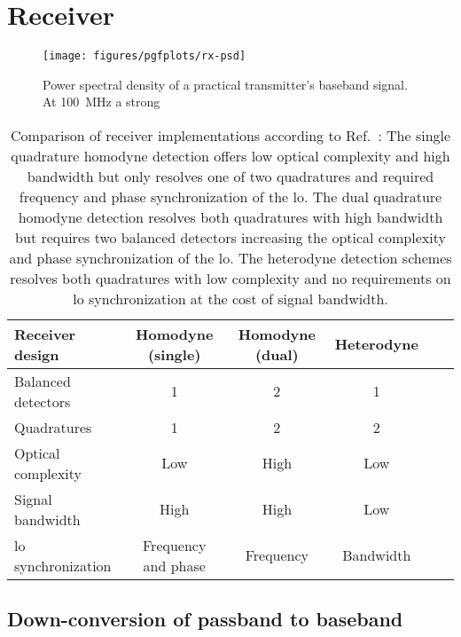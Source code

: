 \section{Receiver}


\begin{figure}[htb]
	\centering
	\texttt{[image: figures/pgfplots/rx-psd]}
	\caption{Power spectral density of a practical transmitter's baseband signal. At \SI{100}{\mega\hertz} a strong }\label{fig:transmit_spectrum}
\end{figure}


\begin{table}[htb]
  \centering
  \begin{tabular}{lccccc}
    \toprule
    Receiver design & Homodyne (single) & Homodyne (dual) & Heterodyne \\
    \midrule
    Balanced detectors & \num{1} & \num{2} & \num{1} \\
    Quadratures & \num{1} & \num{2} & \num{2} \\
    Optical complexity & Low & High & Low \\
    Signal bandwidth & High & High & Low \\
    \gls{lo} synchronization & Frequency and phase & Frequency & Bandwidth \\
    \bottomrule
  \end{tabular}
  \caption{Comparison of receiver implementations according to Ref.~\cite{Brunner2017}: The single quadrature homodyne detection offers low optical complexity and high bandwidth but only resolves one of two quadratures and required frequency and phase synchronization of the \gls{lo}. The dual quadrature homodyne detection resolves both quadratures with high bandwidth but requires two balanced detectors increasing the optical complexity and phase synchronization of the \gls{lo}. The heterodyne detection schemes resolves both quadratures with low complexity and no requirements on \gls{lo} synchronization at the cost of signal bandwidth.}\label{tab:receivers}
\end{table}

\subsection{Down-conversion of passband to baseband}


